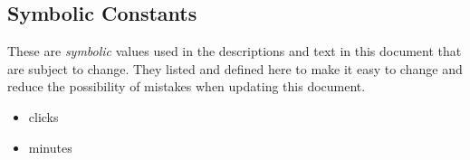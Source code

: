 \documentclass[12pt, titlepage]{article}
\begin{document}
\subsection{Symbolic Constants} \label{secsymbolic_constants}
These are \textit{symbolic} values used in the descriptions and text in this document that are 
subject to change. They listed and defined here to make it easy to change and reduce the
possibility of mistakes when updating this document.
\begin{itemize}
  \item {} clicks
  \item {} minutes
\end{itemize}
\end{document}
